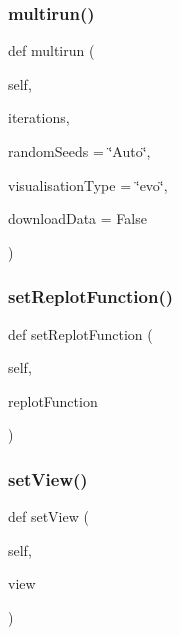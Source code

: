 \subsubsection{\texorpdfstring{multirun()}{multirun()}}
{\footnotesize\ttfamily def multirun (\begin{DoxyParamCaption}\item[{}]{self,  }\item[{}]{iterations,  }\item[{}]{random\+Seeds = {\ttfamily \char`\"{}Auto\char`\"{}},  }\item[{}]{visualisation\+Type = {\ttfamily \char`\"{}evo\char`\"{}},  }\item[{}]{download\+Data = {\ttfamily False} }\end{DoxyParamCaption})}

\mbox{\label{class_mu_mo_t_1_1_mu_mo_tcontroller_aafc1e69cab41071217fe6676a8089249}} 
\subsubsection{\texorpdfstring{set\+Replot\+Function()}{setReplotFunction()}}
{\footnotesize\ttfamily def set\+Replot\+Function (\begin{DoxyParamCaption}\item[{}]{self,  }\item[{}]{replot\+Function }\end{DoxyParamCaption})}

\mbox{\label{class_mu_mo_t_1_1_mu_mo_tcontroller_a40e22e664ecb6e379377ee1cea60073c}} 
\subsubsection{\texorpdfstring{set\+View()}{setView()}}
{\footnotesize\ttfamily def set\+View (\begin{DoxyParamCaption}\item[{}]{self,  }\item[{}]{view }\end{DoxyParamCaption})}

